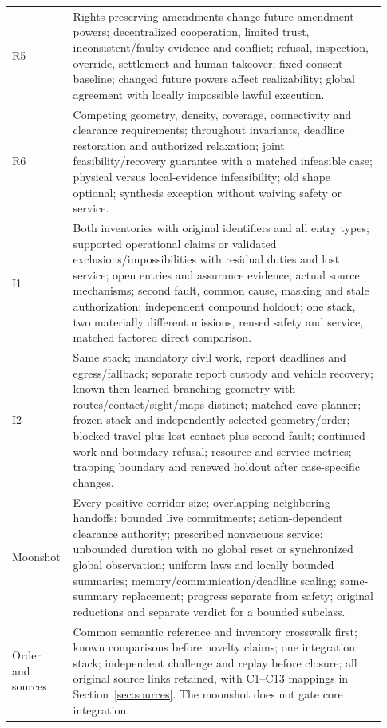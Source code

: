 \documentclass[11pt]{article}
\begin{document}
{\begin{longtable}{@{}P{0.12\linewidth}P{0.81\linewidth}@{}}
R5 & Rights-preserving amendments change future amendment powers; decentralized cooperation, limited trust, inconsistent/faulty evidence and conflict; refusal, inspection, override, settlement and human takeover; fixed-consent baseline; changed future powers affect realizability; global agreement with locally impossible lawful execution. \\
R6 & Competing geometry, density, coverage, connectivity and clearance requirements; throughout invariants, deadline restoration and authorized relaxation; joint feasibility/recovery guarantee with a matched infeasible case; physical versus local-evidence infeasibility; old shape optional; synthesis exception without waiving safety or service. \\
I1 & Both inventories with original identifiers and all entry types; supported operational claims or validated exclusions/impossibilities with residual duties and lost service; open entries and assurance evidence; actual source mechanisms; second fault, common cause, masking and stale authorization; independent compound holdout; one stack, two materially different missions, reused safety and service, matched factored direct comparison. \\
I2 & Same stack; mandatory civil work, report deadlines and egress/fallback; separate report custody and vehicle recovery; known then learned branching geometry with routes/contact/sight/maps distinct; matched cave planner; frozen stack and independently selected geometry/order; blocked travel plus lost contact plus second fault; continued work and boundary refusal; resource and service metrics; trapping boundary and renewed holdout after case-specific changes. \\
Moonshot & Every positive corridor size; overlapping neighboring handoffs; bounded live commitments; action-dependent clearance authority; prescribed nonvacuous service; unbounded duration with no global reset or synchronized global observation; uniform laws and locally bounded summaries; memory/communication/deadline scaling; same-summary replacement; progress separate from safety; original reductions and separate verdict for a bounded subclass. \\
Order and sources & Common semantic reference and inventory crosswalk first; known comparisons before novelty claims; one integration stack; independent challenge and replay before closure; all original source links retained, with C1--C13 mappings in Section~\ref{sec:sources}. The moonshot does not gate core integration. \\
\bottomrule
\end{longtable}
}
\end{document}
